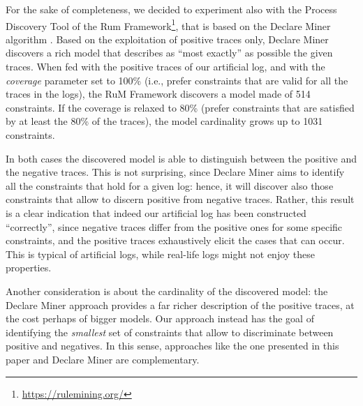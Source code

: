 \documentclass[a4wide,11pt]{article}
\theoremstyle{definition}
\theoremstyle{plain}
\begin{document}
For the sake of completeness, we decided to experiment also with the Process Discovery Tool of the Rum Framework\footnote{\url{https://rulemining.org/}}, that is based on the Declare Miner algorithm \cite{2018a-Maggi}. Based on the exploitation of positive traces only, Declare Miner discovers a rich model that describes as ``most exactly'' as possible the given traces. When fed with the positive traces of our artificial log, and with the \emph{coverage} parameter set to 100\% (i.e., prefer constraints that are valid for all the traces in the logs), the RuM Framework discovers a model made of 514 constraints. If the coverage is relaxed to 80\% (prefer constraints that are satisfied by at least the 80\% of the traces), the model cardinality grows up to 1031 constraints.

In both cases the discovered model is able to distinguish between the positive and the negative traces. This is not surprising, since Declare Miner aims to identify all the constraints that hold for a given log: hence, it will discover also those constraints that allow to discern positive from negative traces. Rather, this result is a clear indication that indeed our artificial log has been constructed ``correctly'', since negative traces differ from the positive ones for some specific constraints, and the positive traces exhaustively elicit the cases that can occur. 
This is typical of artificial logs, while real-life logs might not enjoy these properties.

Another consideration is about the cardinality of the discovered model: the Declare Miner approach provides a far richer description of the positive traces, at the cost perhaps of bigger models. Our approach instead has the goal of identifying the \emph{smallest} set of constraints that allow to discriminate between positive and negatives. In this sense, approaches like the one presented in this paper and Declare Miner are complementary.

\end{document}
